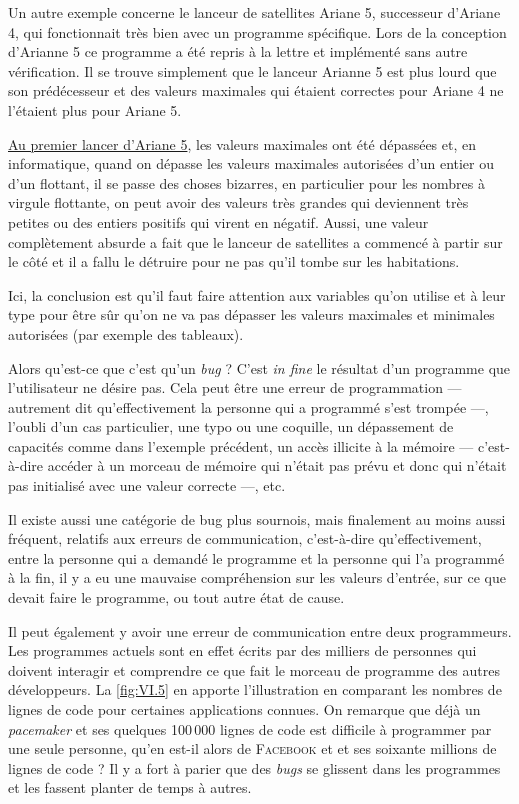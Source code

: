 %
Un autre exemple concerne le lanceur de satellites Ariane 5, successeur d'Ariane 4, qui fonctionnait très bien avec un programme spécifique. Lors de la conception d'Arianne 5 ce programme a été repris à la lettre et implémenté sans autre vérification. Il se trouve simplement que le lanceur Arianne 5 est plus lourd que son prédécesseur et des valeurs maximales qui étaient correctes pour Ariane 4 ne l'étaient plus pour Ariane 5.

\href{https://fr.wikipedia.org/wiki/Vol_501_d\%27Ariane_5}{Au premier lancer d'Ariane 5}, les valeurs maximales ont été dépassées et, en informatique, quand on dépasse les valeurs maximales autorisées d'un entier ou d'un flottant, il se passe des choses bizarres, en particulier pour les nombres à virgule flottante, on peut avoir des valeurs très grandes qui deviennent très petites ou des entiers positifs qui virent en négatif. Aussi, une valeur complètement absurde a fait que le lanceur de satellites a commencé à partir sur le côté et il a fallu le détruire pour ne pas qu'il tombe sur les habitations. 

\pagebreak

%
Ici, la conclusion est qu'il faut faire attention aux variables qu'on utilise et à leur type pour être sûr qu'on ne va pas dépasser les valeurs maximales et minimales autorisées (par exemple des tableaux). 

Alors qu'est-ce que c'est qu'un \textit{bug} ? C'est \textit{in fine} le résultat d'un programme que l'utilisateur ne désire pas. Cela peut être une erreur de programmation --- autrement dit qu'effectivement la personne qui a programmé s'est trompée ---, l'oubli d'un cas particulier, une typo ou une coquille, un dépassement de capacités comme dans l'exemple précédent, un accès illicite à la mémoire --- c'est-à-dire accéder à un morceau de mémoire qui n'était pas prévu et donc qui n'était pas initialisé avec une valeur correcte ---, etc.

Il existe aussi une catégorie de bug plus sournois, mais finalement au moins aussi fréquent, relatifs aux erreurs de communication, c'est-à-dire qu'effectivement, entre la personne qui a demandé le programme et la personne qui l'a programmé à la fin, il y a eu une mauvaise compréhension sur les valeurs d'entrée, sur ce que devait faire le programme, ou tout autre état de cause. 
 
Il peut également y avoir une erreur de communication entre deux programmeurs. Les programmes actuels sont en effet écrits par des milliers de personnes qui doivent interagir et comprendre ce que fait le morceau de programme des autres développeurs. La \cref{fig:VI.5} en apporte l'illustration en comparant les nombres de lignes de code pour certaines applications connues. On remarque que déjà un \textit{pacemaker} et ses quelques 100\,000 lignes de code est difficile à programmer par une seule personne, qu'en est-il alors de \textsc{Facebook} et et ses soixante millions de lignes de code ? Il y a fort à parier que des \textit{bugs} se glissent dans les programmes et les fassent planter de temps à autres.


